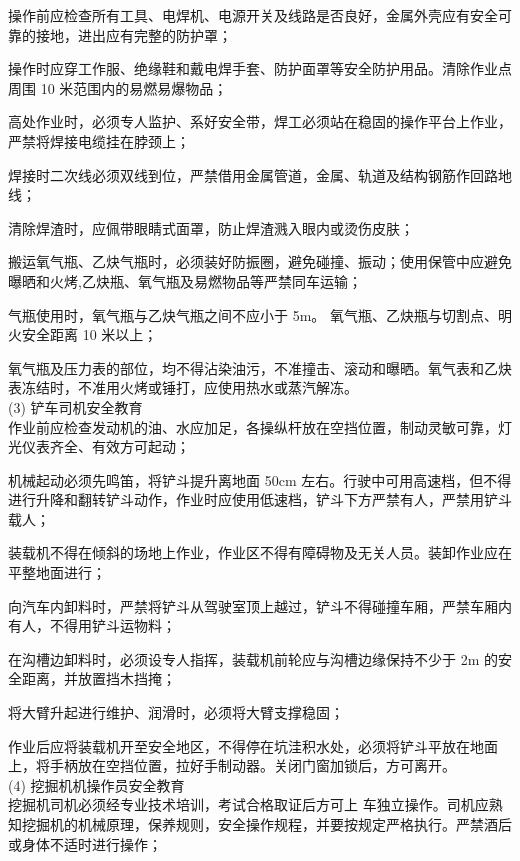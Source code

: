  操作前应检查所有工具、电焊机、电源开关及线路是否良好，金属外壳应有安全可靠的接地，进出应有完整的防护罩；

 操作时应穿工作服、绝缘鞋和戴电焊手套、防护面罩等安全防护用品。清除作业点周围 10 米范围内的易燃易爆物品；

 高处作业时，必须专人监护、系好安全带，焊工必须站在稳固的操作平台上作业，严禁将焊接电缆挂在脖颈上；

 焊接时二次线必须双线到位，严禁借用金属管道，金属、轨道及结构钢筋作回路地线；

 清除焊渣时，应佩带眼睛式面罩，防止焊渣溅入眼内或烫伤皮肤；

 搬运氧气瓶、乙炔气瓶时，必须装好防振圈，避免碰撞、振动；使用保管中应避免曝晒和火烤,乙炔瓶、氧气瓶及易燃物品等严禁同车运输；

 气瓶使用时，氧气瓶与乙炔气瓶之间不应小于 5m。 氧气瓶、乙炔瓶与切割点、明火安全距离 10 米以上；

 氧气瓶及压力表的部位，均不得沾染油污，不准撞击、滚动和曝晒。氧气表和乙炔表冻结时，不准用火烤或锤打，应使用热水或蒸汽解冻。 \\

(3) 铲车司机安全教育\\

 作业前应检查发动机的油、水应加足，各操纵杆放在空挡位置，制动灵敏可靠，灯光仪表齐全、有效方可起动；

 机械起动必须先鸣笛，将铲斗提升离地面 50cm 左右。行驶中可用高速档，但不得进行升降和翻转铲斗动作，作业时应使用低速档，铲斗下方严禁有人，严禁用铲斗载人；

 装载机不得在倾斜的场地上作业，作业区不得有障碍物及无关人员。装卸作业应在平整地面进行；

 向汽车内卸料时，严禁将铲斗从驾驶室顶上越过，铲斗不得碰撞车厢，严禁车厢内有人，不得用铲斗运物料；

在沟槽边卸料时，必须设专人指挥，装载机前轮应与沟槽边缘保持不少于 2m 的安全距离，并放置挡木挡掩；

 将大臂升起进行维护、润滑时，必须将大臂支撑稳固；

 作业后应将装载机开至安全地区，不得停在坑洼积水处，必须将铲斗平放在地面上，将手柄放在空挡位置，拉好手制动器。关闭门窗加锁后，方可离开。\\


(4) 挖掘机机操作员安全教育\\

 挖掘机司机必须经专业技术培训，考试合格取证后方可上
车独立操作。司机应熟知挖掘机的机械原理，保养规则，安全操作规程，并要按规定严格执行。严禁酒后或身体不适时进行操作；


